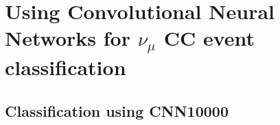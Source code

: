 \chapter{Using Convolutional Neural Networks for $\nu_{\mu}$ CC event classification}\label{ch:cnn_results}
\section{Classification using CNN10000}

